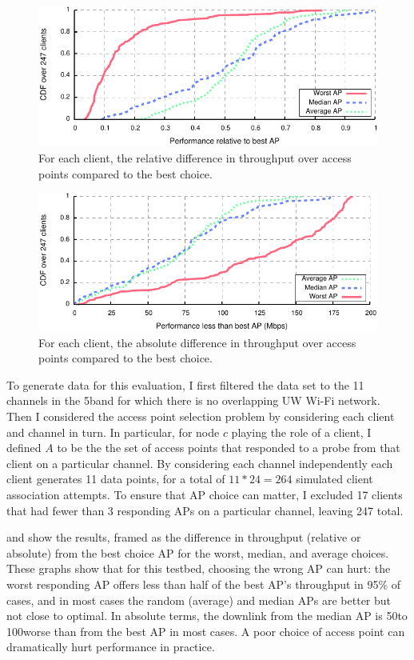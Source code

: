 \begin{figure}[t]
	\centering
	\includegraphics[width=\textwidth]{figures/applications/ap_sel_rel_diff.pdf}
	\caption{\label{fig:ap_sel_rel_diff}For each client, the relative difference in throughput over access points compared to the best choice.}
\end{figure}
\begin{figure}[!ht]
	\centering
	\includegraphics[width=\textwidth]{figures/applications/ap_sel_tpt_diff.pdf}
	\caption{\label{fig:ap_sel_tpt_diff}For each client, the absolute difference in throughput over access points compared to the best choice.}
\end{figure}

To generate data for this evaluation, I first filtered the data set to the 11 channels in the 5\GHz band for which there is no overlapping UW Wi-Fi network. Then I considered the access point selection problem by considering each client and channel in turn. In particular, for node $c$ playing the role of a client, I defined $A$ to be the the set of access points that responded to a probe from that client on a particular channel. By considering each channel independently each client generates 11 data points, for a total of $11*24=264$ simulated client association attempts. To ensure that AP choice can matter, I excluded 17 clients that had fewer than 3 responding APs on a particular channel, leaving 247 total.

 and  show the results, framed as the difference in throughput (relative or absolute) from the best choice AP for the worst, median, and average choices. These graphs show that for this testbed, choosing the wrong AP can hurt: the worst responding AP offers less than half of the best AP's throughput in 95\% of cases, and in most cases the random (average) and median APs are better but not close to optimal. In absolute terms, the downlink from the median AP is 50\Mbps to 100\Mbps worse than from the best AP in most cases. A poor choice of access point can dramatically hurt performance in practice.

